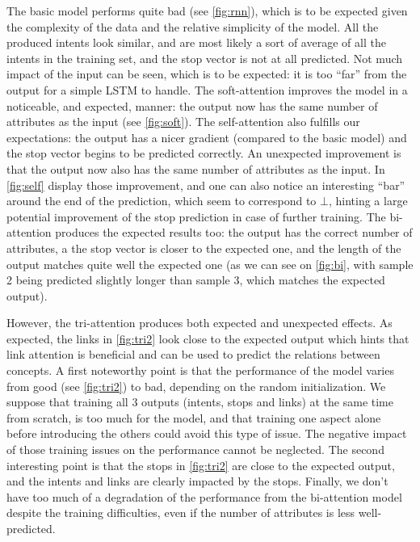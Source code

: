 The basic model performs quite bad (see \cref{fig:rnn}), which is to be expected given the complexity of the data and the relative simplicity of the model. All the produced intents look similar, and are most likely a sort of average of all the intents in the training set, and the stop vector is not at all predicted. Not much impact of the input can be seen, which is to be expected: it is too ``far'' from the output for a simple LSTM to handle. 
%
The soft-attention improves the model in a noticeable, and expected, manner: the output now has the same number of attributes as the input (see \cref{fig:soft}).
%
The self-attention also fulfills our expectations: the output has a nicer gradient (compared to the basic model) and the stop vector begins to be predicted correctly.
An unexpected improvement is that the output now also has the same number of attributes as the input.
In \cref{fig:self} display those improvement, and one can also notice an interesting ``bar'' around the end of the prediction, which seem to correspond to $\bot$, hinting a large potential improvement of the stop prediction in case of further training.
%
The bi-attention produces the expected results too: the output has the correct number of attributes, a the stop vector is closer to the expected one, and the length of the output matches quite well the expected one (as we can see on \cref{fig:bi}, with sample 2 being predicted slightly longer than sample 3, which matches the expected output).

However, the tri-attention produces both expected and unexpected effects. 
As expected, the links in  \cref{fig:tri2} look close to the expected output which hints that link attention is beneficial and can be used to predict the relations between concepts.
%
A first noteworthy point is that the performance of the model varies from good (see \cref{fig:tri2}) to bad, depending on the random initialization. We suppose that training all 3 outputs (intents, stops and links) at the same time from scratch, is too much for the model, and that training one aspect alone before introducing the others could avoid this type of issue. The negative impact of those training issues on the performance cannot be neglected.
%
The second interesting point is that the stops in \cref{fig:tri2} are close to the expected output, and the intents and links are clearly impacted by the stops.
%
Finally, we don't have too much of a degradation of the performance from the bi-attention model despite the training difficulties, even if the number of attributes is less well-predicted. 

